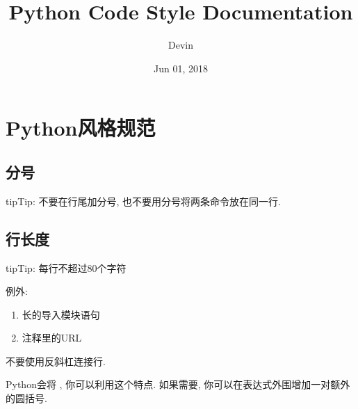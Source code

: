 \documentclass[a4paper,10pt,english]{sphinxmanual}
\title{Python Code Style Documentation}
\date{Jun 01, 2018}
\author{Devin}
\begin{document}
\maketitle
\sphinxtableofcontents
{}\label{\detokenize{index::doc}}



\chapter{Python风格规范}
\label{\detokenize{python_style_rules:python}}\label{\detokenize{python_style_rules::doc}}

\section{分号}
\label{\detokenize{python_style_rules:id1}}
\begin{sphinxadmonition}{tip}{Tip:}
不要在行尾加分号, 也不要用分号将两条命令放在同一行.
\end{sphinxadmonition}


\section{行长度}
\label{\detokenize{python_style_rules:line-length}}\label{\detokenize{python_style_rules:id2}}
\begin{sphinxadmonition}{tip}{Tip:}
每行不超过80个字符
\end{sphinxadmonition}

例外:
\begin{enumerate}
\item {} 
长的导入模块语句

\item {} 
注释里的URL

\end{enumerate}

不要使用反斜杠连接行.

Python会将  , 你可以利用这个特点. 如果需要, 你可以在表达式外围增加一对额外的圆括号.
\end{document}
